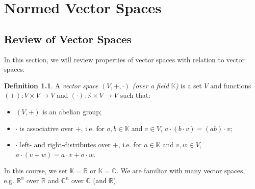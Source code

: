 \documentclass[a4paper, openany]{memoir}
\theoremstyle{definition}
\newtheorem{definition}{Definition}[section]
\theoremstyle{plain}
\begin{document}
    \chapter{Normed Vector Spaces}

    \section{Review of Vector Spaces}
    In this section, we will review properties of vector spaces with relation to vector spaces.

    \begin{definition}
        A \emph{vector space $(V, +, \cdot)$ (over a field $\mathbb{K}$)} is a set $V$ and functions $(+) \colon V \times V \to V$ and $(\cdot) \colon \mathbb{K} \times V \to V$ such that:
        \begin{itemize}
            \item $(V, +)$ is an abelian group;
            \item $\cdot$ is associative over $+$, i.e. for $a, b \in \mathbb{K}$ and $v \in V$, $a \cdot (b \cdot v) = (ab) \cdot v$;
            \item $\cdot$ left- and right-distributes over $+$, i.e. for $a \in \mathbb{K}$ and $v, w \in V$, $a \cdot (v + w) = a \cdot v + a \cdot w$.
        \end{itemize}
    \end{definition}
    \noindent In this course, we set $\mathbb{K} = \mathbb{R}$ or $\mathbb{K} = \mathbb{C}$. We are familiar with many vector spaces, e.g. $\mathbb{R}^n$ over $\mathbb{R}$ and $\mathbb{C}^n$ over $\mathbb{C}$ (and $\mathbb{R}$). 
\end{document}
